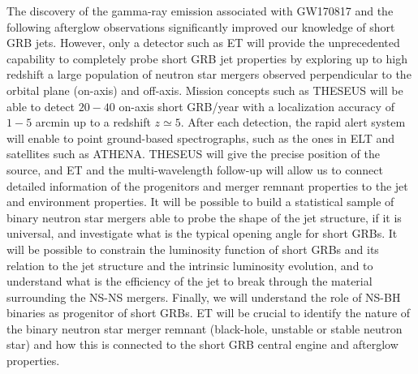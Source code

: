 The discovery of the gamma-ray emission  associated with GW170817 and the following afterglow observations significantly improved our knowledge of short GRB jets. However, only a detector such as ET will provide the unprecedented capability to completely probe short GRB jet properties by exploring up to high redshift a large population of neutron star mergers observed perpendicular to the orbital plane (on-axis) and off-axis. Mission concepts such as THESEUS will be able to detect $20-40$ on-axis short GRB/year with a localization accuracy of $1-5$ arcmin up to a redshift $z\simeq 5$.
After each detection, the rapid alert system will enable to point ground-based spectrographs, such as the ones in ELT and satellites such as ATHENA. THESEUS will give the precise position of the source, and ET and the multi-wavelength follow-up will allow us to connect detailed information of the progenitors and merger remnant properties to the jet and environment properties. It will be possible to build a statistical sample of binary neutron star mergers  able to probe the shape of the jet structure, if it is universal, and investigate what is the typical opening angle for short GRBs. It will be possible  to constrain the  luminosity function  of short GRBs and its relation to the jet structure and the intrinsic luminosity evolution, and to understand what is the efficiency of the jet to break through the material surrounding the NS-NS mergers. Finally, we will understand  the role of NS-BH binaries as progenitor of short GRBs. ET will be crucial to identify the nature of the binary neutron star merger remnant (black-hole, unstable or stable neutron star) and how this is connected to the short GRB central engine and afterglow properties.

%


